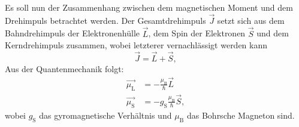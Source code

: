 Es soll nun der Zusammenhang zwischen dem magnetischen Moment und dem Drehimpuls betrachtet werden.
Der Gesamtdrehimpuls $\vec{J}$ setzt sich aus dem Bahndrehimpuls der Elektronenhülle $\vec{L}$, dem Spin der Elektronen $\vec{S}$ und dem Kerndrehimpuls zusammen, wobei letzterer vernachlässigt
werden kann
\begin{equation*}
\vec{J} = \vec{L} + \vec{S},
\end{equation*}
Aus der Quantenmechanik folgt:
\begin{align*}
\vec{\mu_\text{L}} &= -\frac{\mu_\text{B}}{\hbar}\vec{L} \\
\vec{\mu_\text{S}} &= -g_\text{S}\frac{\mu_\text{B}}{\hbar}\vec{S},
\end{align*}
wobei $g_\text{S}$ das gyromagnetische Verhältnis und $\mu_\text{B}$ das Bohrsche Magneton sind.

